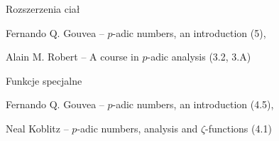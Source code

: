 \begin{enumx}
\begin{enumx}
\end{enumx}
\item{Rozszerzenia ciał}
\begin{enumx}
	\item Fernando Q. Gouvea -- $p$-adic numbers, an introduction (5),
	\item Alain M. Robert -- A course in $p$-adic analysis (3.2, 3.A)
\end{enumx}
\item{Funkcje specjalne}
\begin{enumx}
	\item Fernando Q. Gouvea -- $p$-adic numbers, an introduction (4.5),
	\item Neal Koblitz -- $p$-adic numbers, analysis and $\zeta$-functions (4.1)
\end{enumx}
\end{enumx}






